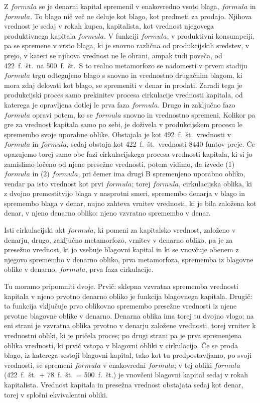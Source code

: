 \documentclass[kapital_02.tex]{subfiles}
\begin{document}
Z \( formula \) se je denarni kapital spremenil v enakovredno vsoto blaga, \( formula \) in \( formula \). To blago nič več ne deluje kot blago, kot predmeti za prodajo. Njihova vrednost je sedaj v rokah kupca, kapitalista, kot vrednost njegovega produktivnega kapitala \( formula \). V funkciji \( formula \), v produktivni konsumpciji, pa se spremene v vrsto blaga, ki je snovno različna od produkcijskih sredstev, v prejo, v kateri se njihova vrednost ne le ohrani, ampak tudi poveča, od 422~f.~št.\ na 500~f.~št.\ S to realno metamorfozo se nadomesti v prvem stadiju \( formula \) trgu odtegnjeno blago s snovno in vrednostno drugačnim blagom, ki mora zdaj delovati kot blago, se spremeniti v denar in prodati. Zaradi tega je produkcijski proces samo prekinitev procesa cirkulacije vrednosti kapitala, od katerega je opravljena dotlej le prva faza \( formula \). Drugo in zaključno fazo \( formula \) opravi potem, ko se \( formula \) snovno in vrednostno spremeni. Kolikor pa gre za vrednost kapitala samo po sebi, je doživela v produkcijskem procesu le spremembo svoje uporabne oblike. Obstajala je kot 492~f.~št.\ vrednosti v \( formula \) in \( formula \), sedaj obstaja kot 422~f.~št.\ vrednosti 8440 funtov preje. Če opazujemo torej samo obe fazi cirkulacijskega procesa vrednosti kapitala, ki si jo zamislimo ločeno od njene presežne vrednosti, potem vidimo, da izvede (1) \( formula \) in (2) \( formula \), pri čemer ima drugi B spremenjeno uporabno obliko, vendar pa isto vrednost kot prvi \( formula \); torej \( formula \), cirkulacijska oblika, ki z dvojno premestitvijo blaga v nasprotni smeri, spremembo denarja v blago in spremembo blaga v denar, nujno zahteva vrnitev vrednosti, ki je bila založena kot denar, v njeno denarno obliko: njeno vzvratno spremembo v denar.

Isti cirkulacijski akt \( formula \), ki pomeni za kapitalsko vrednost, založeno v denarju, drugo, zaključno metamorfozo, vrnitev v denarno obliko, pa je za presežno vrednost, ki jo vsebuje blagovni kapital in ki se vnovčuje obenem z njegovo spremembo v denarno obliko, prva metamorfoza, sprememba iz blagovne oblike v denarno, \( formula \), prva faza cirkulacije.

Tu moramo pripomniti dvoje. Prvič: sklepna vzvratna sprememba vrednosti kapitala v njeno prvotno denarno obliko je funkcija blagovnega kapitala. Drugič: ta funkcija vključuje prvo oblikovno spremembo presežne vrednosti iz njene prvotne blagovne oblike v denarno. Denarna oblika ima torej tu dvojno vlogo; na eni strani je vzvratna oblika prvotno v denarju založene vrednosti, torej vrnitev k vrednostni obliki, ki je pričela proces; po drugi strani pa je prva spremenjena oblika vrednosti, ki prvič vstopa v blagovni obliki v cirkulacijo. Če se proda blago, iz katerega sestoji blagovni kapital, tako kot tu predpostavljamo, po svoji vrednosti, se spremeni \( formula \) v enakovredni \( formula \); v tej obliki \( formula \) (422~f.~št.\ + 78~f.~št.\ = 500~f.~št.) je vnovčeni blagovni kapital sedaj v rokah kapitalista. Vrednost kapitala in presežna vrednost obstajata sedaj kot denar, torej v splošni ekvivalentni obliki.
\end{document}
